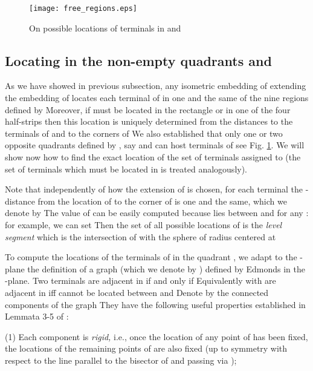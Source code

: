 \documentclass[11pt]{amsart}
\begin{document}
\begin{figure}
\begin{center}
\texttt{[image: free\_regions.eps]}
\end{center}
\caption{On possible locations of terminals in  and }
\label{zone}
\end{figure}




\subsection{Locating in the non-empty quadrants  and }\label{Q}

As we have showed in previous subsection, any isometric embedding  of  extending the embedding  of  locates each terminal  of 
in one and the same of the nine regions defined by  Moreover, if  must be located in the rectangle  or in one of the four half-strips 
then this location  is uniquely determined from the distances to the terminals of  and to the corners of  We also established that
only one or two opposite quadrants defined by , say  and  can host terminals of  see Fig. \ref{zone}. We will show now how
to find the exact location of the set  of terminals assigned to  (the set  of terminals which must be located in  is treated analogously).

Note that independently of how the extension  of  is chosen, for each terminal  the -distance  from the location of  to the corner  of  is one and the same, which we denote by  The value of    can be easily computed because  lies between  and  for any : for example, we can set    Then the set of all possible locations  of  is the {\it level segment}  which is the intersection of   with the sphere  of radius   centered at 

To compute the locations of the terminals of  in the quadrant , we adapt to the -plane
the definition of a graph (which we denote by ) defined by Edmonds \cite{Ed} in the -plane.
Two terminals  are adjacent in  if and only if   Equivalently
 with  are adjacent in  iff  cannot be located between  and
   Denote by  the connected components of the graph 
They have the following useful properties established in Lemmata 3-5 of \cite{Ed}:





\medskip\noindent
(1) Each component  is {\it rigid,} i.e., once the location
of any point  of   has been fixed, the locations of the remaining points of 
are also fixed (up to symmetry with respect to the line parallel to the bisector of   and
passing via );
\end{document}
